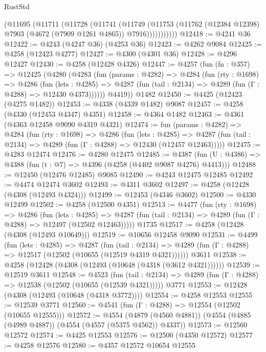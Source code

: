 \begin{lexlean}{RustStd}
\begin{coremodule}
{\begin{coremodule}
{{{{{{{{{{{{{{{{            (@11695
              (@11711
                (@11728
                  (@11741
                    (@11749
                      (@11753
                        (@11762 (@12384 @12398) @7903 (@4672 (@7909 @1261 @4865)) @7916)))))))))))
@12418 := @4241 @36
@12422 := @4243 (@4247 @36) (@4253 @36)
@12423 := @4262 @9084
@12425 := @4258 (@12423 @4277)
@12427 := @4300 (@4301 @36)
@12428 := @4296 @12427
@12430 := @4258 (@12428 @4326)
@12447 := @4257
    (fun (fn : @357) =>
    @12425
      (@4280
        (@4283
          (fun (params : @4282) =>
          @4284
            (fun (rty : @1698) =>
            @4286
              (fun (lets : @4285) =>
              @4287 (fun (tail : @2134) => @4289 (fun (Γ : @4288) => @12430 @4373))))))
        @4419))
    @1482
@12450 := @4425 (@12423 (@4275 @1482))
@12453 := @4338 (@4339 @1482) @9087
@12457 := @4258 (@4330 (@12453 @4347) @4351)
@12458 := @4364 @1482
@12463 := @4361 (@4363 @12458 @9090 @4319 @4321)
@12474 := fun (params : @4282) =>
  @4284
    (fun (rty : @1698) =>
    @4286
      (fun (lets : @4285) =>
      @4287 (fun (tail : @2134) => @4289 (fun (Γ : @4288) => @12430 (@12457 @12463)))))
@12475 := @4283 @12474
@12476 := @4280 @12475
@12485 := @4387 (fun (U : @4386) => @4388 (fun (t : @7) => @4396 (@4258 (@4402 @9087 @4276) @4413)))
@12488 := @12450 (@12476 @12485) @9085
@12490 := @4243 @12475 @12485
@12492 := @4474 @12474 @3602
@12493 := @4311 @3602
@12497 := @4258 (@12428 (@4308 (@12493 @4324)))
@12499 := @12453 (@4346 @3602)
@12500 := @4330 @12499
@12502 := @4258 (@12500 @4351)
@12513 := @4477
    (fun (rty : @1698) =>
    @4286
      (fun (lets : @4285) =>
      @4287 (fun (tail : @2134) => @4289 (fun (Γ : @4288) => @12497 (@12502 @12463)))))
    @1735
@12517 := @4258 (@12428 (@4308 (@12493 @10649)))
@12519 := @10656 @12458 @9090
@12531 := @4499
    (fun (lets : @4285) =>
    @4287
      (fun (tail : @2134) =>
      @4289 (fun (Γ : @4288) => @12517 (@12502 (@10655 (@12519 @4319 @4321))))))
    @3611
@12538 := @4258 (@12428 (@4308 (@12493 (@10648 (@4318 (@3612 @4321))))))
@12539 := @12519 @3611
@12548 := @4523
    (fun (tail : @2134) => @4289 (fun (Γ : @4288) => @12538 (@12502 (@10655 (@12539 @4321)))))
    @3771
@12553 := @12428 (@4308 (@12493 (@10648 (@4318 @3772))))
@12554 := @4258 @12553
@12555 := @12539 @3771
@12560 := @4541 (fun (Γ : @4288) => @12554 (@12502 (@10655 @12555)))
@12572 := @4554
    (@4879 (@4560 @4881))
    (@4554 (@4885 (@4989 @4887)) (@4554 (@4557 (@5375 @4562)) @4337))
@12573 := @12560 @12572
@12574 := @4425 @12553
@12576 := @12500 (@4350 @12572)
@12577 := @4258 @12576
@12580 := @4357 @12572 @10654 @12555
}}}}}}}}}}}}}}}}
\end{coremodule}}
\end{coremodule}
\end{lexlean}
